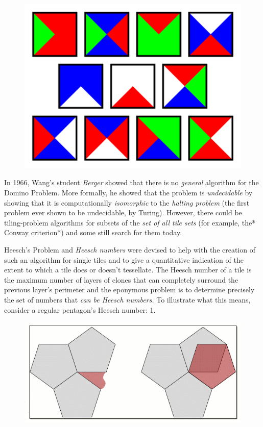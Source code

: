 \begin{figure}[htbp]
\centering
\includegraphics{image_7.png}
\caption{}
\end{figure}

In 1966, Wang's student \emph{Berger} showed that there is no
\emph{general} algorithm for the Domino Problem. More formally, he
showed that the problem is \emph{undecidable} by showing that it is
computationally \emph{isomorphic} to the \emph{halting problem} (the
first problem ever shown to be undecidable, by Turing). However, there
could be tiling-problem algorithms for subsets of the \emph{set of all
tile sets} (for example, the* Conway criterion*) and some still search
for them today.

Heesch's Problem and \emph{Heesch numbers} were devised to help with the
creation of such an algorithm for single tiles and to give a
quantitative indication of the extent to which a tile does or doesn't
tessellate. The Heesch number of a tile is the maximum number of layers
of clones that can completely surround the previous layer's perimeter
and the eponymous problem is to determine precisely the set of numbers
that \emph{can be Heesch numbers.} To illustrate what this means,
consider a regular pentagon's Heesch number: 1.

\begin{figure}[htbp]
\centering
\includegraphics{image_8.gif}
\caption{}
\end{figure}

